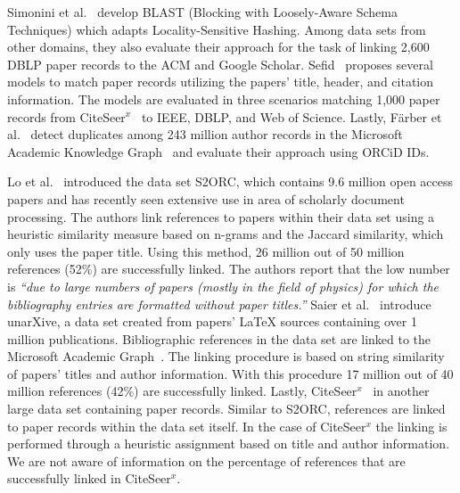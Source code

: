 Simonini et al.~\cite{Simonini2016blast} develop BLAST (Blocking with Loosely-Aware Schema Techniques) which adapts Locality-Sensitive Hashing. Among data sets from other domains, they also evaluate their approach for the task of linking 2,600 DBLP paper records to the ACM and Google Scholar. 
Sefid~\cite{Sefid2019} proposes several models to match paper records utilizing the papers' title, header, and citation information. The models are evaluated in three scenarios matching 1,000 paper records from CiteSeer$^x$~\cite{CiteSeerX2019} to IEEE, DBLP, and Web of Science.
Lastly, Färber et al.~\cite{FaerberLin2022} detect duplicates among 243 million author records in the Microsoft Academic Knowledge Graph~\cite{MAKG} and evaluate their approach using ORCiD IDs.

%
Lo et al.~\cite{Lo2020} introduced the data set S2ORC, which contains 9.6 million open access papers and has recently seen extensive use in area of scholarly document processing. The authors link references to papers within their data set using a heuristic similarity measure based on n-grams and the Jaccard similarity, which only uses the paper title. Using this method, 26 million out of 50 million references  (52\%) are successfully linked. The authors report that the low number is \textit{``due to large numbers of papers (mostly in the field of physics) for which the bibliography entries are formatted without paper titles.''} Saier et al.~\cite{Saier2020} introduce unarXive, a data set created from papers' \LaTeX{} sources containing over 1 million publications. Bibliographic references in the data set are linked to the Microsoft Academic Graph~\cite{Sinha2015,Wang2019}. The linking procedure is based on string similarity of papers' titles and author information. With this procedure 17 million out of 40 million references (42\%) are successfully linked.
Lastly, CiteSeer$^x$~\cite{Wu2015,CiteSeerX2019} in another large data set containing paper records. Similar to S2ORC, references are linked to paper records within the data set itself. In the case of CiteSeer$^x$ the linking is performed through a heuristic assignment based on title and author information.  We are not aware of information on the percentage of references that are successfully linked in CiteSeer$^x$.

